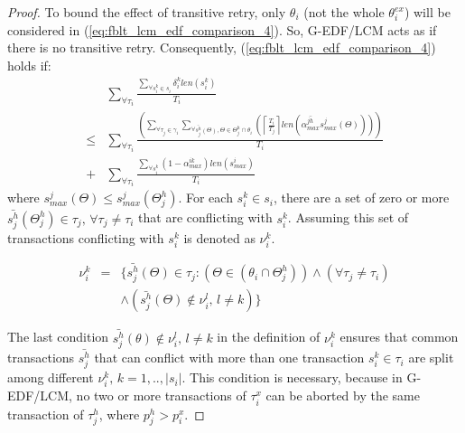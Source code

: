 \documentclass[conference]{IEEEtran}
\begin{document}
\begin{proof}
To bound the effect of transitive retry, only $\theta_i$ (not the whole $\theta_i^{ex}$) will be considered in (\ref{eq:fblt_lcm_edf_comparison_4}). So, G-EDF/LCM acts as if there is no transitive retry. Consequently, (\ref{eq:fblt_lcm_edf_comparison_4}) holds if: 
\begin{eqnarray}
 & \sum_{\forall\tau_{i}}\frac{\sum_{\forall s_{i}^{k}\in s_{i}}\delta_i^k len(s_{i}^{k})}{T_{i}}\label{eq:fblt_lcm_edf_comparison_4_1}\\
\le & \sum_{\forall\tau_{i}}\frac{\left(\sum_{\forall\tau_{j}\in\gamma_{i}}\sum_{\forall\bar{s_{j}^{h}}(\Theta),\Theta \in \Theta_j^h \cap \theta_{i}}\left(\left\lceil \frac{T_{i}}{T_{j}}\right\rceil len\left(\bar{\alpha_{max}^{jh}}s_{max}^{j}(\Theta)\right)\right)\right)}{T_{i}}\nonumber \\
+ & \sum_{\forall\tau_{i}}\frac{\sum_{\forall s_{i}^{k}}\left(1-\alpha_{max}^{ik}\right)len\left(s_{max}^{i}\right)}{T_{i}}\nonumber 
\end{eqnarray}
where $s_{max}^j(\Theta) \le s_{max}^j(\Theta_j^h)$. 
For each $s_{i}^{k}\in s_{i}$, there are a set of zero or more $\bar{s_{j}^{h}}(\Theta_j^h)\in\tau_{j},\,\forall\tau_{j}\ne\tau_{i}$
that are conflicting with $s_{i}^{k}$. Assuming this set of transactions conflicting with $s_{i}^{k}$ is denoted as $\nu_i^k$. 
\begin{comment}
$\nu_{i}^{k} = \left\{ \bar{s_{j}^{h}}(\Theta)\in\tau_{j} : \left(\Theta\in\theta_{i} \cap \Theta_j^h \right) \wedge \left(\forall\tau_{j}\ne\tau_{i}\right) \wedge \left( \bar{s_{j}^{h}} (\theta) \not\in \nu_{i}^{l} ,\, l\ne k\right) \right\}$.
\end{comment}

\begin{eqnarray*}
\nu_{i}^{k} & = & \Big\{\bar{s_{j}^{h}}(\Theta)\in\tau_{j}:\left(\Theta\in(\theta_{i}\cap\Theta_j^h)\right)\wedge\left(\forall\tau_{j}\ne\tau_{i}\right)\\
& & \wedge\left(\bar{s_{j}^{h}}(\Theta)\not\in\nu_{i}^{l},\, l\ne k\right)\Big\}
\end{eqnarray*}

The last condition $\bar{s_{j}^{h}}(\theta)\not\in\nu_{i}^{l},\, l\ne k$
in the definition of $\nu_{i}^{k}$ ensures that common transactions
$\bar{s_{j}^{h}}$ that can conflict with more than one transaction
$s_{i}^{k}\in\tau_{i}$ are split among different $\nu_{i}^{k},\, k=1,..,|s_{i}|$.
This condition is necessary, because in G-EDF/LCM, no two or more transactions
of $\tau_{i}^{x}$ can be aborted by the same transaction of $\tau_{j}^{h}$, 
where $p_{j}^{h}>p_{i}^{x}$.


\end{proof}
\end{document}

